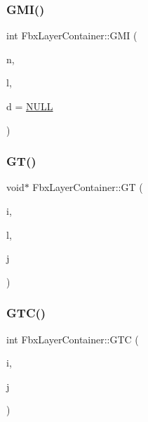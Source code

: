 \mbox{\label{class_fbx_layer_container_a53555220e17a982099d63915e21b4d2e}} 
\subsubsection{\texorpdfstring{G\+M\+I()}{GMI()}}
{\footnotesize\ttfamily int Fbx\+Layer\+Container\+::\+G\+MI (\begin{DoxyParamCaption}\item[{const char $\ast$}]{n,  }\item[{\hyperlink{fbxtypes_8h_ae9fb141d8158a730aa85ec5ff2ea3f6b}{Fbx\+U\+Int}}]{l,  }\item[{void $\ast$}]{d = {\ttfamily \hyperlink{fbxarch_8h_a070d2ce7b6bb7e5c05602aa8c308d0c4}{N\+U\+LL}} }\end{DoxyParamCaption})}

\mbox{\label{class_fbx_layer_container_a9fe0f22f34716fa8c8e0e0b85f8766f1}} 
\subsubsection{\texorpdfstring{G\+T()}{GT()}}
{\footnotesize\ttfamily void$\ast$ Fbx\+Layer\+Container\+::\+GT (\begin{DoxyParamCaption}\item[{int}]{i,  }\item[{\hyperlink{fbxtypes_8h_ae9fb141d8158a730aa85ec5ff2ea3f6b}{Fbx\+U\+Int}}]{l,  }\item[{int}]{j }\end{DoxyParamCaption})}

\mbox{\label{class_fbx_layer_container_a6f4b9a4b47dadd5ed0b80a3677042514}} 
\subsubsection{\texorpdfstring{G\+T\+C()}{GTC()}}
{\footnotesize\ttfamily int Fbx\+Layer\+Container\+::\+G\+TC (\begin{DoxyParamCaption}\item[{\hyperlink{fbxtypes_8h_ae9fb141d8158a730aa85ec5ff2ea3f6b}{Fbx\+U\+Int}}]{i,  }\item[{int}]{j }\end{DoxyParamCaption})}

